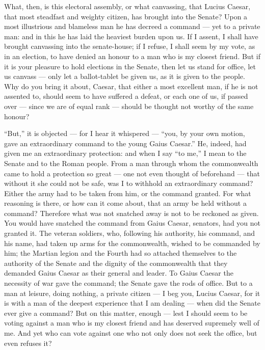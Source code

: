  What, then, is this electoral assembly, or what canvassing, that Lucius Caesar, that most steadfast and weighty citizen, has brought into the Senate? Upon a most illustrious and blameless man he has decreed a command --- yet to a private man: and in this he has laid the heaviest burden upon us. If I assent, I shall have brought canvassing into the senate-house; if I refuse, I shall seem by my vote, as in an election, to have denied an honour to a man who is my closest friend. But if it is your pleasure to hold elections in the Senate, then let us stand for office, let us canvass --- only let a ballot-tablet be given us, as it is given to the people. Why do you bring it about, Caesar, that either a most excellent man, if he is not assented to, should seem to have suffered a defeat, or each one of us, if passed over --- since we are of equal rank --- should be thought not worthy of the same honour?

 ``But,'' it is objected --- for I hear it whispered --- ``you, by your own motion, gave an extraordinary command to the young Gaius Caesar.'' He, indeed, had given me an extraordinary protection: and when I say ``to me,'' I mean to the Senate and to the Roman people. From a man through whom the commonwealth came to hold a protection so great --- one not even thought of beforehand --- that without it she could not be safe, was I to withhold an extraordinary command? Either the army had to be taken from him, or the command granted. For what reasoning is there, or how can it come about, that an army be held without a command? Therefore what was not snatched away is not to be reckoned as given. You would have snatched the command from Gaius Caesar, senators, had you not granted it. The veteran soldiers, who, following his authority, his command, and his name, had taken up arms for the commonwealth, wished to be commanded by him; the Martian legion and the Fourth had so attached themselves to the authority of the Senate and the dignity of the commonwealth that they demanded Gaius Caesar as their general and leader. To Gaius Caesar the necessity of war gave the command; the Senate gave the rods of office. But to a man at leisure, doing nothing, a private citizen --- I beg you, Lucius Caesar, for it is with a man of the deepest experience that I am dealing --- when did the Senate ever give a command? But on this matter, enough --- lest I should seem to be voting against a man who is my closest friend and has deserved supremely well of me. And yet who can vote against one who not only does not seek the office, but even refuses it?

